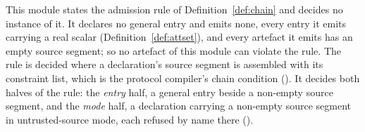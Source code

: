 
\begin{remark}\label{rem:chain-admission}
This module states the admission rule of Definition~\ref{def:chain} and
decides no instance of it. It declares no general entry and emits none, every
entry it emits carrying a real scalar (Definition~\ref{def:attset}), and every
artefact it emits has an empty source segment; so no artefact of this module
can violate the rule. The rule is decided where a declaration's source
segment is assembled with its constraint list, which is the protocol
compiler's chain condition (). It
decides both halves of the rule: the \emph{entry} half, a general entry
beside a non-empty source segment, and the \emph{mode} half, a declaration
carrying a non-empty source segment in untrusted-source mode, each refused by
name there ().
\end{remark}
